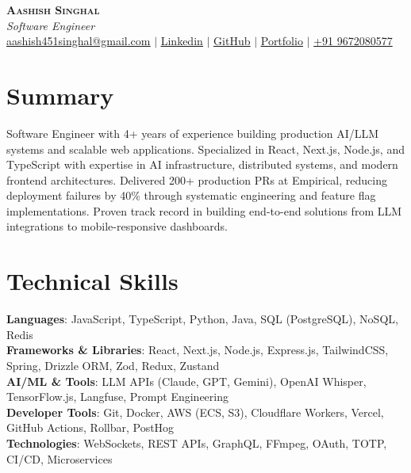 \documentclass[letterpaper,11pt]{article}
\begin{document}

\begin{center}
    \textbf{\Huge \scshape Aashish Singhal} \\ \vspace{1pt}
    \small \textit{Software Engineer} \\[3pt]
    \href{mailto:aashish451singhal@gmail.com}{\underline{aashish451singhal@gmail.com}} $|$
    \href{https://www.linkedin.com/in/iamaashish5}{\underline{Linkedin}} $|$
    \href{https://github.com/AashishSinghal}{\underline{GitHub}} $|$
    \href{https://aashishsinghal.com}{\underline{Portfolio}} $|$
    {\underline{+91 9672080577}}
\end{center}

\section*{Summary}
Software Engineer with 4+ years of experience building production AI/LLM systems and scalable web applications. Specialized in React, Next.js, Node.js, and TypeScript with expertise in AI infrastructure, distributed systems, and modern frontend architectures. Delivered 200+ production PRs at Empirical, reducing deployment failures by 40\% through systematic engineering and feature flag implementations. Proven track record in building end-to-end solutions from LLM integrations to mobile-responsive dashboards.\justifying %

\section{Technical Skills}
 \begin{itemize}[leftmargin=0.15in, label={}]
    \small{\item{
     \textbf{Languages}{: JavaScript, TypeScript, Python, Java, SQL (PostgreSQL), NoSQL, Redis} \\
     \textbf{Frameworks \& Libraries}{: React, Next.js, Node.js, Express.js, TailwindCSS, Spring, Drizzle ORM, Zod, Redux, Zustand} \\
     \textbf{AI/ML \& Tools}{: LLM APIs (Claude, GPT, Gemini), OpenAI Whisper, TensorFlow.js, Langfuse, Prompt Engineering} \\
     \textbf{Developer Tools}{: Git, Docker, AWS (ECS, S3), Cloudflare Workers, Vercel, GitHub Actions, Rollbar, PostHog} \\
     \textbf{Technologies}{: WebSockets, REST APIs, GraphQL, FFmpeg, OAuth, TOTP, CI/CD, Microservices}
    }}
 \end{itemize}
\end{document}
